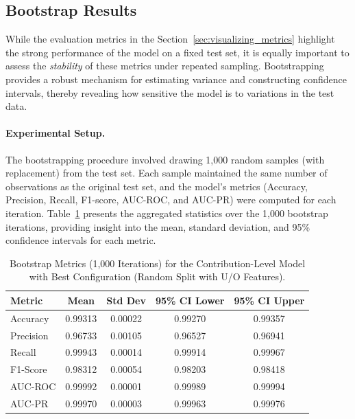 \documentclass[
    13pt, %
    a4paper, %
    listof=totoc, %
    bibliography=totoc, %
    index=totoc, %
    headsepline
]{scrreprt}
\begin{document}
\subsection{Bootstrap Results}
\label{sec:bootstrap_best_model}

While the evaluation metrics in the Section~\ref{sec:visualizing_metrics} highlight the strong performance of the model on a fixed test set, it is equally important to assess the \emph{stability} of these metrics under repeated sampling. Bootstrapping provides a robust mechanism for estimating variance and constructing confidence intervals, thereby revealing how sensitive the model is to variations in the test data.

\paragraph{Experimental Setup.}
The bootstrapping procedure involved drawing 1{,}000 random samples (with replacement) from the test set. Each sample maintained the same number of observations as the original test set, and the model’s metrics (Accuracy, Precision, Recall, F1-score, AUC-ROC, and AUC-PR) were computed for each iteration. Table~\ref{tab:bootstrap_metrics} presents the aggregated statistics over the 1{,}000 bootstrap iterations, providing insight into the mean, standard deviation, and 95\% confidence intervals for each metric.

\begin{table}[H]
    \centering
    \caption{Bootstrap Metrics (1,000 Iterations) for the Contribution-Level Model with Best Configuration (Random Split with U/O Features).}
    \vspace{1em}
    \label{tab:bootstrap_metrics}
    \begin{tabular}{lcccc}
    \toprule
    \textbf{Metric} & \textbf{Mean} & \textbf{Std Dev} & \textbf{95\% CI Lower} & \textbf{95\% CI Upper} \\ 
    \midrule
    Accuracy  & 0.99313 & 0.00022 & 0.99270 & 0.99357 \\ 
    Precision & 0.96733 & 0.00105 & 0.96527 & 0.96941 \\ 
    Recall    & 0.99943 & 0.00014 & 0.99914 & 0.99967 \\ 
    F1-Score  & 0.98312 & 0.00054 & 0.98203 & 0.98418 \\ 
    AUC-ROC   & 0.99992 & 0.00001 & 0.99989 & 0.99994 \\ 
    AUC-PR    & 0.99970 & 0.00003 & 0.99963 & 0.99976 \\ 
    \bottomrule
    \end{tabular}
\end{table}
\end{document}
